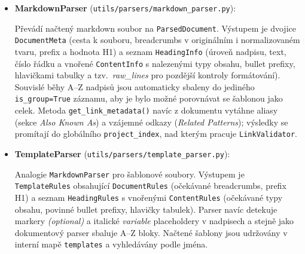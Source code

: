 \documentclass[12pt, a4paper]{article}
\begin{document}
\begin{itemize}
\begin{itemize}
        Modul sdílených parsovacích primitiv. Obsahuje funkce \texttt{parse\_heading\_line()}
        (rozparsuje řádek nadpisu na úroveň, čistý text, odkaz a u šablon i indikátory \emph{optional}
        a italických \emph{variable} placeholderů), \texttt{split\_h1()} (rozdělí H1 na prefix a hodnotu
        podle dvojtečky), \texttt{parse\_breadcrumbs()} (rozpozná breadcrumb řádek od italic instrukcí
        šablony) a \texttt{classify\_content\_line()} (klasifikuje řádek obsahu na typy text, bullet
        list, tabulka, obrázek, odkaz, horizontální čára nebo footnote a extrahuje hlavičky tabulky
        a bullet prefixy). Všechny ostatní parsery pracují právě nad těmito funkcemi.

        \item \textbf{MarkdownParser} (\texttt{utils/parsers/markdown\_parser.py}):

        Převádí načtený markdown soubor na \texttt{ParsedDocument}. Výstupem je dvojice
        \texttt{DocumentMeta} (cesta k souboru, breadcrumbs v originálním i normalizovaném tvaru,
        prefix a hodnota H1) a seznam \texttt{HeadingInfo} (úroveň nadpisu, text, číslo řádku
        a vnořené \texttt{ContentInfo} s nalezenými typy obsahu, bullet prefixy, hlavičkami tabulky
        a tzv.\ \emph{raw\_lines} pro pozdější kontroly formátování). Souvislé běhy A--Z nadpisů
        jsou automaticky sbaleny do jediného \texttt{is\_group=True} záznamu, aby je bylo možné
        porovnávat se šablonou jako celek. Metoda \texttt{get\_link\_metadata()} navíc z dokumentu
        vytáhne aliasy (sekce \emph{Also Known As}) a vzájemné odkazy (\emph{Related Patterns});
        výsledky se promítají do globálního \texttt{project\_index}, nad kterým pracuje
        \texttt{LinkValidator}.

        \item \textbf{TemplateParser} (\texttt{utils/parsers/template\_parser.py}):

        Analogie \texttt{MarkdownParser} pro šablonové soubory. Výstupem je \texttt{TemplateRules}
        obsahující \texttt{DocumentRules} (očekávané breadcrumbs, prefix H1) a seznam
        \texttt{HeadingRules} s vnořenými \texttt{ContentRules} (očekávané typy obsahu, povinné bullet
        prefixy, hlavičky tabulek). Parser navíc detekuje markery \emph{(optional)} a italické
        \emph{variable} placeholdery v nadpisech a stejně jako dokumentový parser sbaluje A--Z bloky.
        Načtené šablony jsou udržovány v interní mapě \texttt{templates} a vyhledávány podle jména.


\end{itemize}
\end{itemize}
\end{document}
